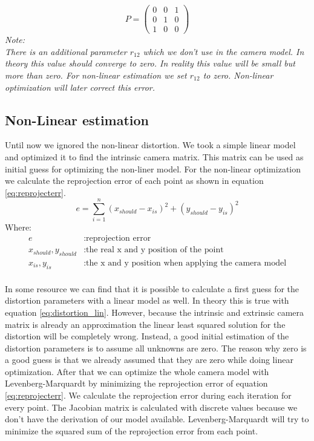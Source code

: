 \documentclass[11pt,a4paper,titlepage,oneside]{report}
\begin{document}
\begin{equation}\label{eq:qr_p}
	P=\begin{pmatrix}
		0 & 0 & 1\\
		0 & 1 & 0\\
		1 & 0 & 0
	\end{pmatrix}
\end{equation}
\em
Note:\\
There is an additional parameter $r_{12}$ which we don't use in the camera model. In theory this value should converge to zero. In reality this value will be small but more than zero. For non-linear estimation we set $r_{12}$ to zero. Non-linear optimization will later correct this error.
\normalfont

\subsection{Non-Linear estimation}\label{sec:nonlinear_est}
Until now we ignored the non-linear distortion. We took a simple linear model and optimized it to find the intrinsic camera matrix. This matrix can be used as initial guess for optimizing the non-liner model. For the non-linear optimization we calculate the reprojection error of each point as shown in equation \ref{eq:reprojecterr}. 
\begin{equation}\label{eq:reprojecterr}
	e=\sum\limits_{i=1}^n(x_{should}-x_{is})^2 +(y_{should}-y_{is})^2
\end{equation}
Where:
\begin{align*}
	e												&: \text{reprojection error}\\
	x_{should},y_{should}		&: \text{the real x and y position of the point}\\
	x_{is},y_{is}						&: \text{the x and y position when applying the camera model}\\
\end{align*}

In some resource we can find that it is possible to calculate a first guess for the distortion parameters with a linear model as well. In theory this is true with equation \ref{eq:distortion_lin}.  However, because the intrinsic and extrinsic camera matrix is already an approximation the linear least squared solution for the distortion will be completely wrong. Instead, a good initial estimation of the distortion parameters is to assume all unknowns are zero. The reason why zero is a good guess is that we already assumed that they are zero while doing linear optimization. After that we can optimize the whole camera model with Levenberg-Marquardt by minimizing the reprojection error of equation \ref{eq:reprojecterr}. We calculate the reprojection error during each iteration for every point. The Jacobian matrix is calculated with discrete values because we don't have the derivation of our model available. Levenberg-Marquardt will try to minimize the squared sum of the reprojection error from each point.
\end{document}
